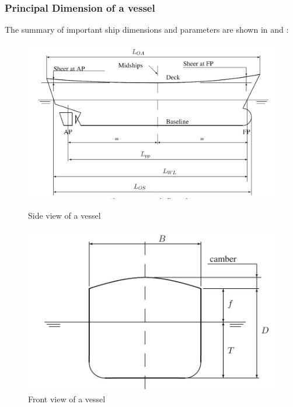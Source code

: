\subsubsection*{Principal Dimension of a vessel}

The summary of important ship dimensions and parameters are shown in  and  :

\begin{figure}[ht]
    \centering
    \begin{minipage}[b]{0.5\linewidth}
        \includegraphics[width=\linewidth]{02_figures/biran14_shipside .jpg}
        \caption{Side view of a vessel}
        \label{fig:biran14_shipside}
    \end{minipage}
    \hfill
    \begin{minipage}[b]{0.45\linewidth}
        \includegraphics[width=\linewidth]{02_figures/biran14_frontship .jpg}
        \caption{Front view of a vessel}
        \label{fig:biran14_shipfront}
    \end{minipage}
\end{figure}

